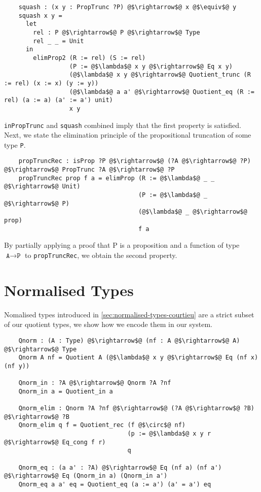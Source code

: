 \documentclass[12pt,twoside,maitrise]{dms}
\theoremstyle{definition}
\numberwithin{equation}{section}
\numberwithin{table}{chapter}
\numberwithin{figure}{chapter}
\newcommand\id[1] {\texttt{#1}}
\begin{document}
\begin{verbatim}
    squash : (x y : PropTrunc ?P) @$\rightarrow$@ x @$\equiv$@ y
    squash x y =
      let
        rel : P @$\rightarrow$@ P @$\rightarrow$@ Type
        rel _ _ = Unit
      in
        elimProp2 (R := rel) (S := rel)
                  (P := @$\lambda$@ x y @$\rightarrow$@ Eq x y)
                  (@$\lambda$@ x y @$\rightarrow$@ Quotient_trunc (R := rel) (x := x) (y := y))
                  (@$\lambda$@ a a' @$\rightarrow$@ Quotient_eq (R := rel) (a := a) (a' := a') unit)
                  x y
\end{verbatim}

\id{inPropTrunc} and \id{squash} combined imply that the first property is satisfied. Next, we state the elimination principle of the propositional truncation of some type \id{P}.

\begin{verbatim}
    propTruncRec : isProp ?P @$\rightarrow$@ (?A @$\rightarrow$@ ?P) @$\rightarrow$@ PropTrunc ?A @$\rightarrow$@ ?P
    propTruncRec prop f a = elimProp (R := @$\lambda$@ _ _ @$\rightarrow$@ Unit)
                                     (P := @$\lambda$@ _ @$\rightarrow$@ P)
                                     (@$\lambda$@ _ @$\rightarrow$@ prop)
                                     f a
\end{verbatim}

By partially applying a proof that P is a proposition and a function of type
$\id{A} \rightarrow \id{P}$ to \id{propTruncRec}, we obtain the second property.

\section{Normalised Types}

Nomalised types introduced in \autoref{sec:normalised-types-courtieu} are a
strict subset of our quotient types, we show how we encode them in our system.

\begin{verbatim}
    Qnorm : (A : Type) @$\rightarrow$@ (nf : A @$\rightarrow$@ A) @$\rightarrow$@ Type
    Qnorm A nf = Quotient A (@$\lambda$@ x y @$\rightarrow$@ Eq (nf x) (nf y))

    Qnorm_in : ?A @$\rightarrow$@ Qnorm ?A ?nf
    Qnorm_in a = Quotient_in a

    Qnorm_elim : Qnorm ?A ?nf @$\rightarrow$@ (?A @$\rightarrow$@ ?B) @$\rightarrow$@ ?B
    Qnorm_elim q f = Quotient_rec (f @$\circ$@ nf)
                                  (p := @$\lambda$@ x y r @$\rightarrow$@ Eq_cong f r)
                                  q

    Qnorm_eq : (a a' : ?A) @$\rightarrow$@ Eq (nf a) (nf a') @$\rightarrow$@ Eq (Qnorm_in a) (Qnorm_in a')
    Qnorm_eq a a' eq = Quotient_eq (a := a') (a' = a') eq
\end{verbatim}
\end{document}
